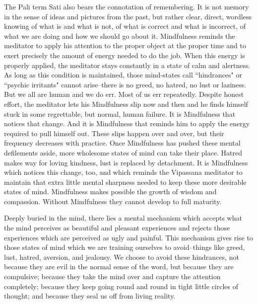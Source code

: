 The Pali term Sati also bears the connotation of remembering. It is not memory
in the sense of ideas and pictures from the past, but rather clear, direct,
wordless knowing of what is and what is not, of what is correct and what is
incorrect, of what we are doing and how we should go about it. Mindfulness
reminds the meditator to apply his attention to the proper object at the proper
time and to exert precisely the amount of energy needed to do the job. When this
energy is properly applied, the meditator stays constantly in a state of calm
and alertness. As long as this condition is maintained, those mind-states call
``hindrances" or ``psychic irritants" cannot arise--there is no greed, no hatred,
no lust or laziness. But we all are human and we do err. Most of us err
repeatedly. Despite honest effort, the meditator lets his Mindfulness slip now
and then and he finds himself stuck in some regrettable, but normal, human
failure. It is Mindfulness that notices that change. And it is Mindfulness that
reminds him to apply the energy required to pull himself out. These slips happen
over and over, but their frequency decreases with practice. Once Mindfulness has
pushed these mental defilements aside, more wholesome states of mind can take
their place. Hatred makes way for loving kindness, lust is replaced by
detachment. It is Mindfulness which notices this change, too, and which reminds
the Vipassana meditator to maintain that extra little mental sharpness needed to
keep these more desirable states of mind. Mindfulness makes possible the growth
of wisdom and compassion. Without Mindfulness they cannot develop to full
maturity.

Deeply buried in the mind, there lies a mental mechanism which accepts what the
mind perceives as beautiful and pleasant experiences and rejects those
experiences which are perceived as ugly and painful. This mechanism gives rise
to those states of mind which we are training ourselves to avoid--things like
greed, lust, hatred, aversion, and jealousy. We choose to avoid these
hindrances, not because they are evil in the normal sense of the word, but
because they are compulsive; because they take the mind over and capture the
attention completely; because they keep going round and round in tight little
circles of thought; and because they seal us off from living reality.

